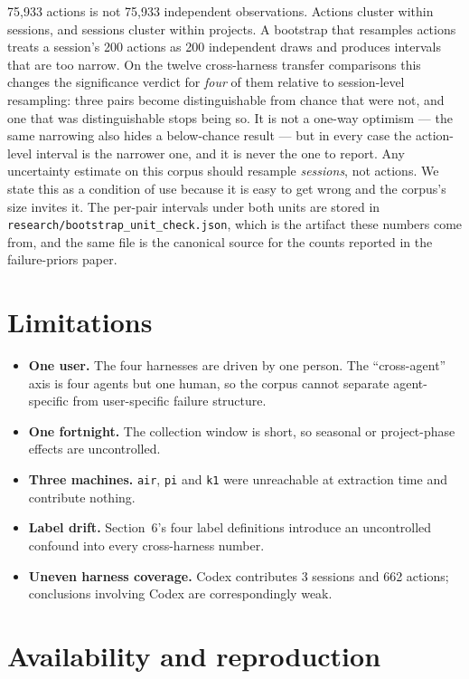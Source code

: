 \documentclass[11pt]{article}
\begin{document}
75,933 actions is not 75,933 independent observations. Actions cluster
within sessions, and sessions cluster within projects. A bootstrap that
resamples actions treats a session's 200 actions as 200 independent
draws and produces intervals that are too narrow. On the twelve
cross-harness transfer comparisons this changes the significance verdict
for \emph{four} of them relative to session-level resampling: three pairs
become distinguishable from chance that were not, and one that was
distinguishable stops being so. It is not a one-way optimism --- the same
narrowing also hides a below-chance result --- but in every case the
action-level interval is the narrower one, and it is never the one to
report. Any uncertainty estimate on this corpus should resample
\emph{sessions}, not actions. We state this as a condition of use because
it is easy to get wrong and the corpus's size invites it. The per-pair
intervals under both units are stored in
\texttt{research/bootstrap\_unit\_check.json}, which is the artifact these
numbers come from, and the same file is the canonical source for the
counts reported in the failure-priors paper.

\section{Limitations}

\begin{itemize}
\item \textbf{One user.} The four harnesses are driven by one person. The
  ``cross-agent'' axis is four agents but one human, so the corpus cannot
  separate agent-specific from user-specific failure structure.
\item \textbf{One fortnight.} The collection window is short, so seasonal
  or project-phase effects are uncontrolled.
\item \textbf{Three machines.} \texttt{air}, \texttt{pi} and \texttt{k1}
  were unreachable at extraction time and contribute nothing.
\item \textbf{Label drift.} Section~6's four label definitions introduce an
  uncontrolled confound into every cross-harness number.
\item \textbf{Uneven harness coverage.} Codex contributes 3 sessions and
  662 actions; conclusions involving Codex are correspondingly weak.
\end{itemize}

\section{Availability and reproduction}
\end{document}
